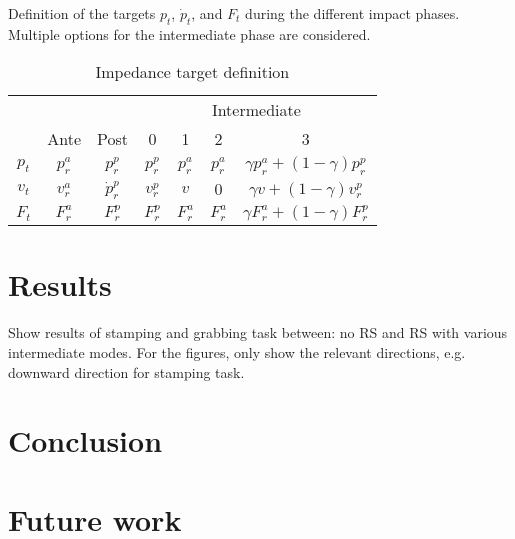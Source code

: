 \documentclass[a4paper, 10pt, conference]{ieeeconf}
\begin{document}
    \begin{table}[h]
      \caption{Impedance target definition}{Definition of the targets $p_t$, $\dot{p}_t$, and $F_t$ during the different impact phases. Multiple options for the intermediate phase are considered.}

    \label{target_defs}
      \centering
    \begin{tabular}{ccc|cccc|}
    \cline{4-7}
                                      &                                    &               & \multicolumn{4}{c|}{Intermediate}                                              \\ \cline{2-7} 
    \multicolumn{1}{c|}{}             & \multicolumn{1}{c|}{Ante}          & Post          & 0             & 1         & 2             & 3                                  \\ \hline
    \multicolumn{1}{|c|}{$p_t$}       & \multicolumn{1}{c|}{$p^a_r$}       & $p^p_r$       & $p^p_r$       & $p^a_r$   & $p^a_r$       & $\gamma p^a_r+(1-\gamma)p^p_r$     \\
    \multicolumn{1}{|c|}{$v_t$} & \multicolumn{1}{c|}{$v^a_r$} & $\dot{p}^p_r$ & $v^p_r$ & $v$ & $0$ & $\gamma v + (1-\gamma)v^p_r$ \\
    \multicolumn{1}{|c|}{$F_t$}       & \multicolumn{1}{c|}{$F^a_r$}       & $F^p_r$       & $F^p_r$       & $F^a_r$   & $F^a_r$       & $\gamma F^a_r + (1-\gamma)F^p_r$   \\ \hline
    \end{tabular}
    \end{table}

    \section{Results}
    Show results of stamping and grabbing task between: no RS and RS with various intermediate modes. For the figures, only show the relevant directions, e.g. downward direction for stamping task.

    \section{Conclusion}

    \section{Future work}
\end{document}

